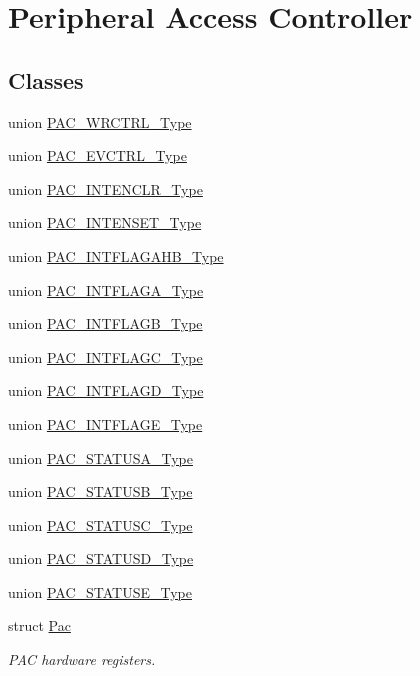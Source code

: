 \hypertarget{group___s_a_m_l21___p_a_c}{}\section{Peripheral Access Controller}
\label{group___s_a_m_l21___p_a_c}
\subsection*{Classes}
\begin{DoxyCompactItemize}
\item 
union \hyperlink{union_p_a_c___w_r_c_t_r_l___type}{P\+A\+C\+\_\+\+W\+R\+C\+T\+R\+L\+\_\+\+Type}
\item 
union \hyperlink{union_p_a_c___e_v_c_t_r_l___type}{P\+A\+C\+\_\+\+E\+V\+C\+T\+R\+L\+\_\+\+Type}
\item 
union \hyperlink{union_p_a_c___i_n_t_e_n_c_l_r___type}{P\+A\+C\+\_\+\+I\+N\+T\+E\+N\+C\+L\+R\+\_\+\+Type}
\item 
union \hyperlink{union_p_a_c___i_n_t_e_n_s_e_t___type}{P\+A\+C\+\_\+\+I\+N\+T\+E\+N\+S\+E\+T\+\_\+\+Type}
\item 
union \hyperlink{union_p_a_c___i_n_t_f_l_a_g_a_h_b___type}{P\+A\+C\+\_\+\+I\+N\+T\+F\+L\+A\+G\+A\+H\+B\+\_\+\+Type}
\item 
union \hyperlink{union_p_a_c___i_n_t_f_l_a_g_a___type}{P\+A\+C\+\_\+\+I\+N\+T\+F\+L\+A\+G\+A\+\_\+\+Type}
\item 
union \hyperlink{union_p_a_c___i_n_t_f_l_a_g_b___type}{P\+A\+C\+\_\+\+I\+N\+T\+F\+L\+A\+G\+B\+\_\+\+Type}
\item 
union \hyperlink{union_p_a_c___i_n_t_f_l_a_g_c___type}{P\+A\+C\+\_\+\+I\+N\+T\+F\+L\+A\+G\+C\+\_\+\+Type}
\item 
union \hyperlink{union_p_a_c___i_n_t_f_l_a_g_d___type}{P\+A\+C\+\_\+\+I\+N\+T\+F\+L\+A\+G\+D\+\_\+\+Type}
\item 
union \hyperlink{union_p_a_c___i_n_t_f_l_a_g_e___type}{P\+A\+C\+\_\+\+I\+N\+T\+F\+L\+A\+G\+E\+\_\+\+Type}
\item 
union \hyperlink{union_p_a_c___s_t_a_t_u_s_a___type}{P\+A\+C\+\_\+\+S\+T\+A\+T\+U\+S\+A\+\_\+\+Type}
\item 
union \hyperlink{union_p_a_c___s_t_a_t_u_s_b___type}{P\+A\+C\+\_\+\+S\+T\+A\+T\+U\+S\+B\+\_\+\+Type}
\item 
union \hyperlink{union_p_a_c___s_t_a_t_u_s_c___type}{P\+A\+C\+\_\+\+S\+T\+A\+T\+U\+S\+C\+\_\+\+Type}
\item 
union \hyperlink{union_p_a_c___s_t_a_t_u_s_d___type}{P\+A\+C\+\_\+\+S\+T\+A\+T\+U\+S\+D\+\_\+\+Type}
\item 
union \hyperlink{union_p_a_c___s_t_a_t_u_s_e___type}{P\+A\+C\+\_\+\+S\+T\+A\+T\+U\+S\+E\+\_\+\+Type}
\item 
struct \hyperlink{struct_pac}{Pac}
\begin{DoxyCompactList}\small\item\em P\+A\+C hardware registers. \end{DoxyCompactList}\end{DoxyCompactItemize}

